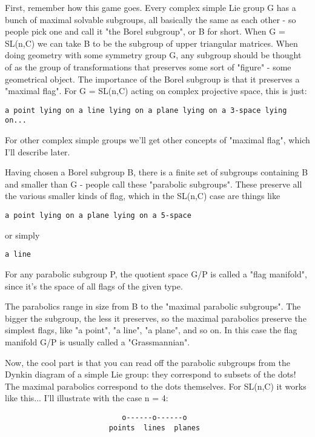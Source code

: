 First, remember how this game goes.  Every complex simple Lie group G has 
a bunch of maximal solvable subgroups, all basically the same as each
other - so people pick one and call it "the Borel subgroup", or B for
short.  When G = SL(n,C) we can take B to be the subgroup of upper
triangular matrices.  When doing geometry with some symmetry group G,
any subgroup should be thought of as the group of transformations that
preserves some sort of "figure" - some geometrical object.  The 
importance of the Borel subgroup is that it 
preserves a "maximal flag".  For G = SL(n,C)
acting on complex projective space, this is just:

\begin{verbatim}
a point lying on a line lying on a plane lying on a 3-space lying on...
\end{verbatim}
    
For other complex simple groups we'll get other concepts of "maximal flag",
which I'll describe later.

Having chosen a Borel subgroup B, there is a finite set of subgroups
containing B and smaller than G - people call these "parabolic
subgroups".  These preserve all the various smaller kinds of flag, 
which in the SL(n,C) case are things like 

\begin{verbatim}
a point lying on a plane lying on a 5-space
\end{verbatim}
    
or simply 

\begin{verbatim}
a line
\end{verbatim}
    
For any parabolic subgroup P, the quotient space G/P is called 
a "flag manifold", since it's the space of all  flags of the given type.

The parabolics range in size from B to the "maximal parabolic subgroups".
The bigger the subgroup, the less it preserves, so the maximal parabolics
preserve the simplest flags, like "a point", "a line", "a plane", and so
on.  In this case the flag manifold G/P is usually called a "Grassmannian".  

Now, the cool part is that you can read off the parabolic subgroups from
the Dynkin diagram of a simple Lie group: they correspond to subsets
of the dots!  The maximal parabolics correspond to the dots themselves.
For SL(n,C) it works like this... I'll illustrate with the case n = 4:

\begin{verbatim}
                           o------o------o
                        points  lines  planes       
\end{verbatim}
    
